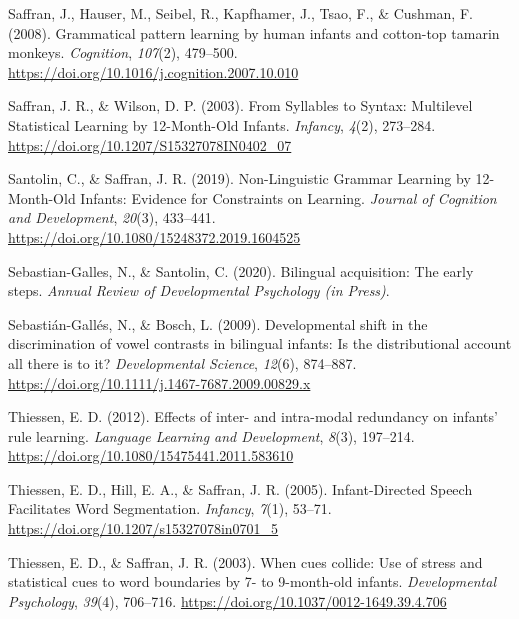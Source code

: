 \documentclass[english,man,man,floatsintext]{apa6}
\begin{document}
\leavevmode\hypertarget{ref-saffran2008}{}%
Saffran, J., Hauser, M., Seibel, R., Kapfhamer, J., Tsao, F., \& Cushman, F. (2008). Grammatical pattern learning by human infants and cotton-top tamarin monkeys. \emph{Cognition}, \emph{107}(2), 479--500. \url{https://doi.org/10.1016/j.cognition.2007.10.010}

\leavevmode\hypertarget{ref-saffran2003}{}%
Saffran, J. R., \& Wilson, D. P. (2003). From Syllables to Syntax: Multilevel Statistical Learning by 12-Month-Old Infants. \emph{Infancy}, \emph{4}(2), 273--284. \url{https://doi.org/10.1207/S15327078IN0402_07}

\leavevmode\hypertarget{ref-santolin2019}{}%
Santolin, C., \& Saffran, J. R. (2019). Non-Linguistic Grammar Learning by 12-Month-Old Infants: Evidence for Constraints on Learning. \emph{Journal of Cognition and Development}, \emph{20}(3), 433--441. \url{https://doi.org/10.1080/15248372.2019.1604525}

\leavevmode\hypertarget{ref-sebastian-galles2020}{}%
Sebastian-Galles, N., \& Santolin, C. (2020). Bilingual acquisition: The early steps. \emph{Annual Review of Developmental Psychology (in Press)}.

\leavevmode\hypertarget{ref-sebastian-galles2009}{}%
Sebastián-Gallés, N., \& Bosch, L. (2009). Developmental shift in the discrimination of vowel contrasts in bilingual infants: Is the distributional account all there is to it? \emph{Developmental Science}, \emph{12}(6), 874--887. \url{https://doi.org/10.1111/j.1467-7687.2009.00829.x}

\leavevmode\hypertarget{ref-thiessen2012}{}%
Thiessen, E. D. (2012). Effects of inter- and intra-modal redundancy on infants' rule learning. \emph{Language Learning and Development}, \emph{8}(3), 197--214. \url{https://doi.org/10.1080/15475441.2011.583610}

\leavevmode\hypertarget{ref-thiessen2005}{}%
Thiessen, E. D., Hill, E. A., \& Saffran, J. R. (2005). Infant-Directed Speech Facilitates Word Segmentation. \emph{Infancy}, \emph{7}(1), 53--71. \url{https://doi.org/10.1207/s15327078in0701_5}

\leavevmode\hypertarget{ref-thiessen2003}{}%
Thiessen, E. D., \& Saffran, J. R. (2003). When cues collide: Use of stress and statistical cues to word boundaries by 7- to 9-month-old infants. \emph{Developmental Psychology}, \emph{39}(4), 706--716. \url{https://doi.org/10.1037/0012-1649.39.4.706}

\endgroup

\clearpage
\makeatletter
\efloat@restorefloats
\makeatother
\end{document}
